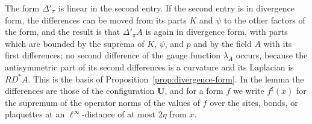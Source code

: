 \documentclass[11pt]{preprint}
\numberwithin{equation}{section}
\begin{document}
The form $\Delta'_\pi$ is linear in the second entry. If the second entry is in divergence form, the differences can be moved from its parts $K$ and $\psi$ to the other factors of the form, and the result is that $\Delta'_\pi A$ is again in divergence form, with parts which are bounded by the suprema of $K$, $\psi$, and $p$ and by the field $A$ with its first differences; no second difference of the gauge function $\lambda_A$ occurs, because the antisymmetric part of its second differences is a curvature and its Laplacian is $RD^*A$. This is the basis of Proposition~\ref{prop:divergence-form}. In the lemma the differences are those of the configuration $\mathbf U$, and for a form $f$ we write $f^\sharp(x)$ for the supremum of the operator norms of the values of $f$ over the sites, bonds, or plaquettes at an $\ell^\infty$-distance of at most $2\eta$ from $x$.
\end{document}

